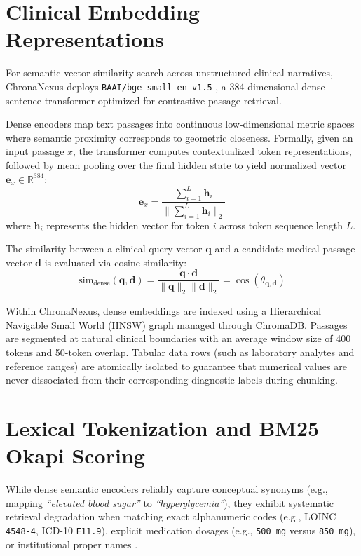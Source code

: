 \section{Clinical Embedding Representations}
\label{sec:dense_embeddings}

For semantic vector similarity search across unstructured clinical narratives, ChronaNexus deploys \texttt{BAAI/\allowbreak bge-small-en-v1.5} \cite{xiao2023bge}, a 384-dimensional dense sentence transformer optimized for contrastive passage retrieval.

Dense encoders map text passages into continuous low-dimensional metric spaces where semantic proximity corresponds to geometric closeness. Formally, given an input passage $x$, the transformer computes contextualized token representations, followed by mean pooling over the final hidden state to yield normalized vector $\mathbf{e}_x \in \mathbb{R}^{384}$:
\begin{equation}
\mathbf{e}_x = \frac{\sum_{i=1}^{L} \mathbf{h}_i}{\|\sum_{i=1}^{L} \mathbf{h}_i\|_2}
\end{equation}
where $\mathbf{h}_i$ represents the hidden vector for token $i$ across token sequence length $L$.

The similarity between a clinical query vector $\mathbf{q}$ and a candidate medical passage vector $\mathbf{d}$ is evaluated via cosine similarity:
\begin{equation}
\text{sim}_{\text{dense}}(\mathbf{q}, \mathbf{d}) = \frac{\mathbf{q} \cdot \mathbf{d}}{\|\mathbf{q}\|_2 \|\mathbf{d}\|_2} = \cos(\theta_{\mathbf{q}, \mathbf{d}})
\end{equation}

Within ChronaNexus, dense embeddings are indexed using a Hierarchical Navigable Small World (HNSW) graph managed through ChromaDB. Passages are segmented at natural clinical boundaries with an average window size of 400 tokens and 50-token overlap. Tabular data rows (such as laboratory analytes and reference ranges) are atomically isolated to guarantee that numerical values are never dissociated from their corresponding diagnostic labels during chunking.

\section{Lexical Tokenization and BM25 Okapi Scoring}
\label{sec:bm25_retrieval}

While dense semantic encoders reliably capture conceptual synonyms (e.g., mapping \textit{``elevated blood sugar''} to \textit{``hyperglycemia''}), they exhibit systematic retrieval degradation when matching exact alphanumeric codes (e.g., LOINC \texttt{4548-4}, ICD-10 \texttt{E11.9}), explicit medication dosages (e.g., \texttt{500~mg} versus \texttt{850~mg}), or institutional proper names \cite{robertson2009bm25,karpukhin2020dpr}.


